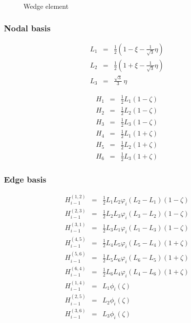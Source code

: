 \begin{figure}[tbhp]
\begin{center}

\caption{Wedge element}
\end{center}
\end{figure}

\subsubsection{Nodal basis}

\begin{eqnarray*}
L_1&=&\frac{1}{2}(1-\xi-\frac{1}{\sqrt{3}}\eta) \\
L_2&=&\frac{1}{2}(1+\xi-\frac{1}{\sqrt{3}}\eta) \\
L_3&=&\frac{\sqrt{3}}{3}\ \eta 
\end{eqnarray*}

\begin{eqnarray*}
H_1&=&\frac{1}{2}L_1(1-\zeta) \\
H_2&=&\frac{1}{2}L_2(1-\zeta) \\
H_3&=&\frac{1}{2}L_3(1-\zeta) \\
H_4&=&\frac{1}{2}L_1(1+\zeta) \\
H_5&=&\frac{1}{2}L_2(1+\zeta) \\
H_6&=&\frac{1}{2}L_3(1+\zeta)
\end{eqnarray*}

\subsubsection{Edge basis}

\begin{eqnarray*}
H_{i-1}^{(1,2)}&=&\frac{1}{2}L_1L_2\varphi_i(L_2-L_1)(1-\zeta) \\
H_{i-1}^{(2,3)}&=&\frac{1}{2}L_2L_3\varphi_i(L_3-L_2)(1-\zeta) \\
H_{i-1}^{(3,1)}&=&\frac{1}{2}L_3L_1\varphi_i(L_1-L_3)(1-\zeta) \\
H_{i-1}^{(4,5)}&=&\frac{1}{2}L_4L_5\varphi_i(L_5-L_4)(1+\zeta) \\
H_{i-1}^{(5,6)}&=&\frac{1}{2}L_5L_6\varphi_i(L_6-L_5)(1+\zeta) \\
H_{i-1}^{(6,4)}&=&\frac{1}{2}L_6L_4\varphi_i(L_4-L_6)(1+\zeta) \\
H_{i-1}^{(1,4)}&=&L_1\phi_i(\zeta) \\
H_{i-1}^{(2,5)}&=&L_2\phi_i(\zeta) \\
H_{i-1}^{(3,6)}&=&L_3\phi_i(\zeta)
\end{eqnarray*}

